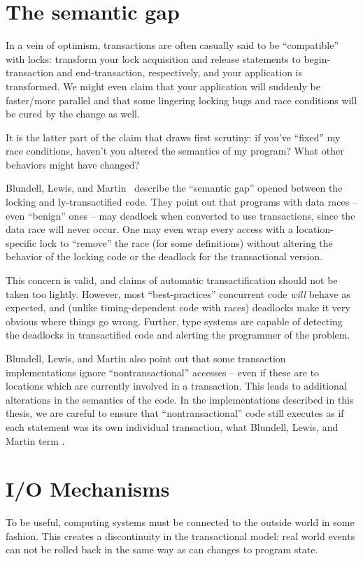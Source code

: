 \section{The semantic gap}\label{sec:semantic}
In a vein of optimism, transactions are often casually said to be
``compatible'' with locks: transform your lock acquisition and release
statements to begin-transaction and end-transaction, respectively, and
your application is transformed.  We might even claim that your
application will suddenly be faster/more parallel and that some
lingering locking bugs and race conditions will be cured by the change
as well.

It is the latter part of the claim that draws first scrutiny: if
you've ``fixed'' my race conditions, haven't you altered the semantics
of my program?  What other behaviors might have changed?

Blundell, Lewis, and Martin~\cite{BlundellLeMa05} describe the
``semantic gap'' opened between the locking and
\naive{}ly-transactified code.  They point out that programs with
data races -- even ``benign'' ones -- may deadlock when converted to
use transactions, since the data race will never occur.  One may even
wrap every access with a location-specific lock to ``remove'' the race
(for some definitions) without altering the behavior of the locking
code or the deadlock for the transactional version.

This concern is valid, and claims of automatic transactification
should not be taken too lightly.  However, most ``best-practices''
concurrent code \emph{will} behave as expected, and (unlike
timing-dependent code with races) deadlocks make it very obvious where
things go wrong.  Further, type systems are capable of detecting the
deadlocks in transactified code and alerting
the programmer of the problem.

Blundell, Lewis, and Martin also point out that some transaction
implementations ignore ``nontransactional'' accesses -- even if these
are to locations which are currently involved in a transaction.  This
leads to additional alterations in the semantics of the code.  In the
implementations described in this thesis, we are careful to ensure
that ``nontransactional'' code still executes as if each statement
was its own individual transaction, what Blundell, Lewis, and Martin
term .

\section{I/O Mechanisms}\label{sec:io}
To be useful, computing systems must be connected to the outside world
in some fashion.  This creates a discontinuity in the transactional model:
real world events can not be rolled back in the same way as can changes
to program state.

